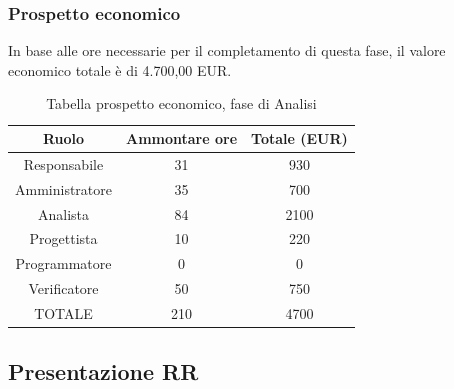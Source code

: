 \subsubsection{Prospetto economico}
In base alle ore necessarie per il completamento di questa fase, il valore economico totale è di 4.700,00 EUR.
\begin{table}[h]
	\caption{Tabella prospetto economico, fase di Analisi}  
\begin{center}
\begin{tabular}{ |c|c|c|  }
 \hline
 Ruolo 		& Ammontare ore 	& Totale (EUR)\\
 	\hline
 \hline
 	Responsabile	& 31 	& 930\\
	Amministratore	& 35		& 700\\
	Analista		& 84 	& 2100\\
	Progettista		& 10		& 220\\
	Programmatore	& 0		& 0\\
	Verificatore	& 50		& 750\\
 \hline\hline
 TOTALE		& 210		& 4700\\
  \hline
\end{tabular}
\end{center}
\end{table}
\newpage
\subsection{Presentazione RR}
